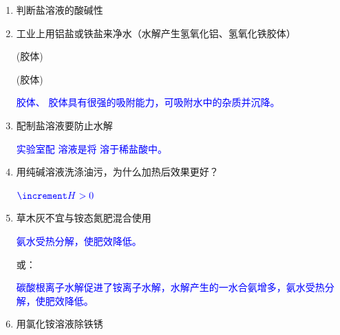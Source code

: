                 \begin{enumerate}
                    \item 判断盐溶液的酸碱性
                    
                    \item 工业上用铝盐或铁盐来净水（水解产生氢氧化铝、氢氧化铁胶体）
                    
                     (胶体)  
                    
                     (胶体) 

                    \textcolor{blue}{ 胶体、 胶体具有很强的吸附能力，可吸附水中的杂质并沉降。}

                    \item 配制盐溶液要防止水解
                    
                    \textcolor{blue}{实验室配  溶液是将  溶于稀盐酸中。}

                    \item 用纯碱溶液洗涤油污，为什么加热后效果更好？
                    
                     \quad \(\mathcolor{blue}{\increment H>0}\)

                    \item 草木灰不宜与铵态氮肥混合使用
                    

                    
                    \textcolor{blue}{氨水受热分解，使肥效降低。}

                    或：

                        

                    \textcolor{blue}{碳酸根离子水解促进了铵离子水解，水解产生的一水合氨增多，氨水受热分解，使肥效降低。}

                    \item 用氯化铵溶液除铁锈
                    
                    

\end{enumerate}
